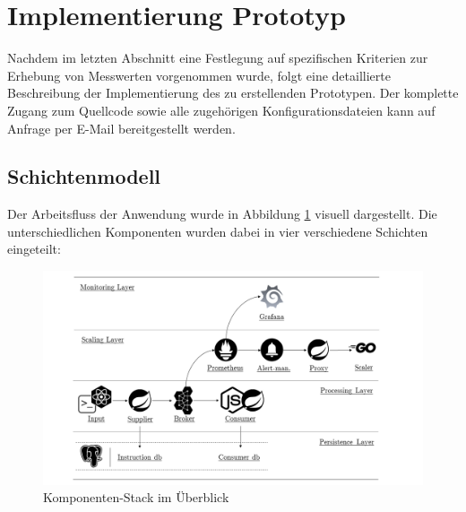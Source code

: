 \section{Implementierung Prototyp}
\label{sec:implementierung}

Nachdem im letzten Abschnitt eine Festlegung auf spezifischen Kriterien zur Erhebung von Messwerten vorgenommen wurde, folgt eine detaillierte Beschreibung der Implementierung des zu erstellenden Prototypen. Der komplette Zugang zum  Quellcode sowie alle zugehörigen Konfigurationsdateien kann auf Anfrage per E-Mail bereitgestellt werden.

\subsection{Schichtenmodell \checkmark}
Der Arbeitsfluss der Anwendung wurde in Abbildung \ref{fig:stackOverview} visuell dargestellt. Die unterschiedlichen Komponenten wurden dabei in vier verschiedene Schichten eingeteilt: 

\begin{figure}[ht!]
	\centering
	\includegraphics[width=\linewidth]{kapitel/problemloesung/implementierung/_img/overview-bw}
	\caption[Komponenten-Stack im Überblick]{Komponenten-Stack im Überblick}
	\label{fig:stackOverview}
\end{figure}

